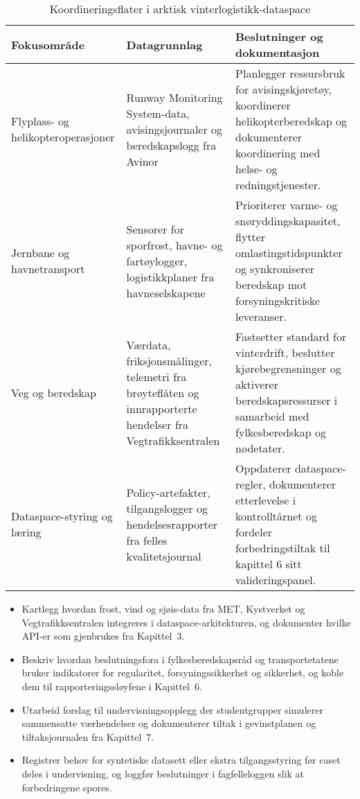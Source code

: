 \begin{table}[h]
    \centering
    \caption{Koordineringsflater i arktisk vinterlogistikk-dataspace}
    \label{tab:arktisk-logistikk}
    \begin{tabular}{p{3.4cm}p{4.7cm}p{4.8cm}}
        \toprule
        Fokusområde & Datagrunnlag & Beslutninger og dokumentasjon \\
        \midrule
        Flyplass- og helikopteroperasjoner & Runway Monitoring System-data, avisingsjournaler og beredskapslogg fra Avinor & Planlegger ressursbruk for avisingskjøretøy, koordinerer helikopterberedskap og dokumenterer koordinering med helse- og redningstjenester.\\
        Jernbane og havnetransport & Sensorer for sporfrost, havne- og fartøylogger, logistikkplaner fra havneselskapene & Prioriterer varme- og snøryddingskapasitet, flytter omlastingstidspunkter og synkroniserer beredskap mot forsyningskritiske leveranser.\\
        Veg og beredskap & Værdata, friksjonsmålinger, telemetri fra brøyteflåten og innrapporterte hendelser fra Vegtrafikksentralen & Fastsetter standard for vinterdrift, beslutter kjørebegrensninger og aktiverer beredskapsressurser i samarbeid med fylkesberedskap og nødetater.\\
        Dataspace-styring og læring & Policy-artefakter, tilgangslogger og hendelsesrapporter fra felles kvalitetsjournal & Oppdaterer dataspace-regler, dokumenterer etterlevelse i kontrolltårnet og fordeler forbedringstiltak til kapittel 6 sitt valideringspanel.\\
        \bottomrule
    \end{tabular}
\end{table}

\begin{itemize}
    \item Kartlegg hvordan frost, vind og sjøis-data fra MET, Kystverket og Vegtrafikksentralen integreres i dataspace-arkitekturen, og dokumenter hvilke API-er som gjenbrukes fra Kapittel~3.\citep{svv2023vinter}
    \item Beskriv hvordan beslutningsfora i fylkesberedskapsråd og transportetatene bruker indikatorer for regularitet, forsyningssikkerhet og sikkerhet, og koble dem til rapporteringssløyfene i Kapittel~6.\citep{tffk2023mobilitet,banenor2023vinter}
    \item Utarbeid forslag til undervisningsopplegg der studentgrupper simulerer sammensatte værhendelser og dokumenterer tiltak i gevinstplanen og tiltaksjournalen fra Kapittel~7.\citep{avinor2023nord}
    \item Registrer behov for syntetiske datasett eller ekstra tilgangsstyring før caset deles i undervisning, og loggfør beslutninger i fagfelleloggen slik at forbedringene spores.\citep{tffk2023mobilitet}
\end{itemize}

